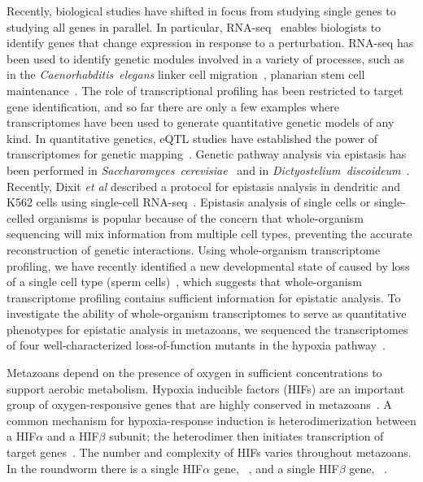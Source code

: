Recently, biological studies have shifted in focus from studying single genes to
studying all genes in parallel. In particular, RNA-seq~\citep{Mortazavi2008}
enables biologists to identify genes that change expression in response to a
perturbation. RNA-seq has been used to identify genetic modules involved in a
variety of processes, such as in the \emph{Caenorhabditis~elegans} linker cell
migration~\citep{Schwarz2012}, planarian stem cell
maintenance~\citep{VanWolfswinkel2014,Scimone2014}. The role of transcriptional
profiling has been restricted to target gene identification, and so far there
are only a few examples where transcriptomes have been used to generate
quantitative genetic models of any kind. In quantitative genetics, eQTL studies
have established the power of transcriptomes for genetic
mapping~\citep{Brem2002,Schadt2003,Li2006,King2014}. Genetic pathway analysis via
epistasis has been performed in
\emph{Saccharomyces~cerevisiae}~\citep{Hughes2000,Capaldi2008} and in
\emph{Dictyostelium~discoideum}~\citep{VanDriessche2005}. Recently, Dixit
\emph{et al} described a protocol for epistasis analysis in dendritic and K562
cells using single-cell RNA-seq~\citep{Dixit2016}. Epistasis analysis of single
cells or single-celled organisms is popular because of the concern that
whole-organism sequencing will mix information from multiple cell types,
preventing the accurate reconstruction of genetic interactions. Using
whole-organism transcriptome profiling, we have recently identified a new
developmental state of \cel{} caused by loss of a single cell type (sperm
cells)~\citep{Angeles-Albores2017a}, which suggests that whole-organism
transcriptome profiling contains sufficient information for epistatic analysis.
To investigate the ability of whole-organism transcriptomes to serve as
quantitative phenotypes for epistatic analysis in metazoans, we sequenced the
transcriptomes of four well-characterized loss-of-function mutants in the \cel{}
hypoxia pathway~\citep{Epstein2001,Shen2006,Shao2009,Jiang2001}.

Metazoans depend on the presence of oxygen in sufficient concentrations to
support aerobic metabolism. Hypoxia inducible factors (HIFs) are an important
group of oxygen-responsive genes that are highly conserved in
metazoans~\citep{Loenarz2011}. A common mechanism for hypoxia-response induction
is heterodimerization between a HIF$\alpha$ and a HIF$\beta$ subunit; the
heterodimer then initiates transcription of target genes~\citep{Jiang1996}. The
number and complexity of HIFs varies throughout metazoans. In the roundworm
\cel{} there is a single HIF$\alpha$ gene, ~\citep{Jiang2001}, and a
single HIF$\beta$ gene, ~\citep{Powell-Coffman1998}.


